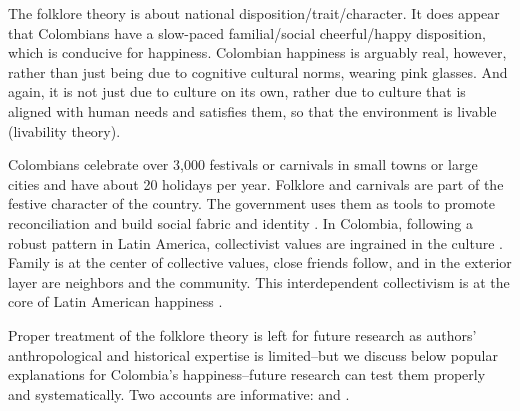 \documentclass[10pt, letterpaper]{article}
\begin{document}
\begin{spacing}{2}
The folklore theory is about %
national disposition/trait/character. It does appear that
Colombians have a slow-paced familial/social cheerful/happy disposition, which is conducive for happiness. 
Colombian happiness is arguably real, however, rather than just being due
to cognitive cultural norms, wearing pink glasses. %
 And again, it is not just due to culture on its own, rather due to culture that
 is aligned with human needs and satisfies them, so that the environment is livable
 (livability theory). 

Colombians celebrate over 3,000 festivals or carnivals in
small towns or large cities and have about 20 holidays per year. Folklore 
and carnivals are part of the festive character of the country. The government uses them as tools to promote reconciliation
and build social fabric and identity \citep{gutierrez2006fiestas}. In Colombia, following a robust pattern in Latin America,
collectivist values are ingrained in the culture \citep{mensing2002collectivism}. Family is at the center of collective values, close friends
follow, and in the exterior layer are neighbors and the community. This interdependent collectivism is at the core of Latin
American happiness \citep{yamamoto16}.

Proper treatment of the folklore theory is left for  future research as
authors' anthropological and historical expertise is
limited--but we discuss below %
  popular explanations for Colombia's happiness--future research can test them properly and systematically. 
 Two accounts are informative:
\citet{bargentWP16jan15} and \citet{wallaceBBC17mar30}.


\end{spacing}
\end{document}
